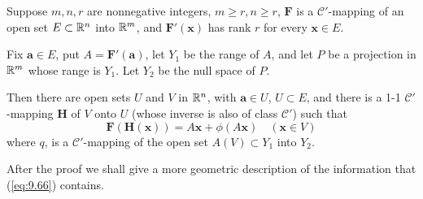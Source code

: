 \begin{thm}
    \label{thm:9.32}
    Suppose $m, n, r$ are nonnegative integers, $m \geq r, n \geq r$, 
    $\mathbf{F}$ is a $\mathscr{C}'$-mapping of an open set $E \subset {\protect\mathbb R}^n$ into ${\protect\mathbb R}^m$, 
    and $\mathbf{F'(x)}$ has rank $r$ for every $\mathbf{x} \in E$.

    Fix $\mathbf{a} \in E$, put $A = \mathbf{F'(a)}$, 
    let $Y_1$ be the range of $A$, 
    and let $P$ be a projection in ${\protect\mathbb R}^m$ whose range is $Y_1$. 
    Let $Y_2$ be the null space of $P$.

    Then there are open sets $U$ and $V$ in ${\protect\mathbb R}^n$, 
    with $\mathbf{a} \in U$, $U \subset E$, 
    and there is a 1-1 $\mathscr{C'}$-mapping $\mathbf{H}$ of $V$ onto $U$ 
    (whose inverse is also of class $\mathscr{C'}$) such that
    \begin{equation}
        \label{eq:9.66}
        \mathbf{F(H(x))} = A\mathbf{x} + \phi(A\mathbf{x})
        \quad 
        (\mathbf{x} \in V)
    \end{equation}
    where $q$, is a $\mathscr{C'}$-mapping of the open set $A(V) \subset Y_1$ into $Y_2$.
\end{thm}

After the proof we shall give a more geometric description of the information that (\ref{eq:9.66}) contains.


